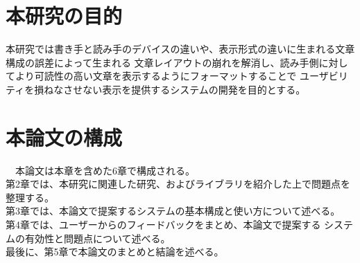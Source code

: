 \section{本研究の目的}
本研究では書き手と読み手のデバイスの違いや、表示形式の違いに生まれる文章構成の誤差によって生まれる
文章レイアウトの崩れを解消し、読み手側に対してより可読性の高い文章を表示するようにフォーマットすることで
ユーザビリティを損ねなさせない表示を提供するシステムの開発を目的とする。

\section{本論文の構成}
 本論⽂は本章を含めた6章で構成される。
 \\第2章では、本研究に関連した研究、およびライブラリを紹介した上で問題点を整理する。
 \\第3章では、本論⽂で提案するシステムの基本構成と使い⽅について述べる。
 \\第4章では、ユーザーからのフィードバックをまとめ、本論⽂で提案する
システムの有効性と問題点について述べる。
 \\最後に、第5章で本論⽂のまとめと結論を述べる。

